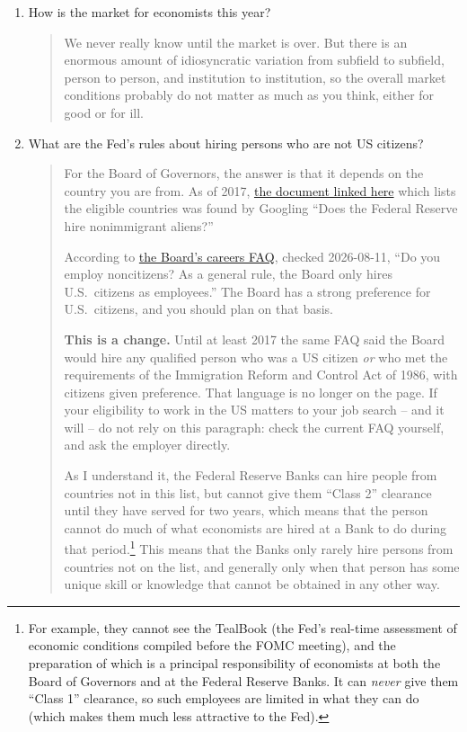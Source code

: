 \documentclass{\classes/econtex}
\begin{document}
\begin{enumerate}
\item  How is the market for economists this year?

  \begin{quote}
    We never really know until the market is over.  But there is an enormous amount of idiosyncratic
    variation from subfield to subfield, person to person, and institution to
    institution, so the overall market conditions probably do not matter as much
    as you think, either for good or for ill.

  \end{quote}
\item  {}  What are the Fed's rules about hiring persons who are not US citizens? 

  \begin{quote}
    For the Board of Governors, the answer is that it depends on the country you are from.  As of 2017, \href{https://www.federalreserve.gov/boarddocs/srletters/2006/SR0614a3.pdf}{the document linked here} which lists the eligible countries was found by Googling ``Does the Federal Reserve hire nonimmigrant aliens?'' 

    According to \href{https://www.federalreserve.gov/careers-faqs.htm}{the Board's careers FAQ}, checked 2026-08-11, ``Do you employ noncitizens?  As a general rule, the Board only hires U.S.\ citizens as employees.''  The Board has a strong preference for U.S.\ citizens, and you should plan on that basis.

      \textbf{This is a change.}  Until at least 2017 the same FAQ said the Board would hire any qualified person who was a US citizen \textit{or} who met the requirements of the Immigration Reform and Control Act of 1986, with citizens given preference.  That language is no longer on the page.  If your eligibility to work in the US matters to your job search -- and it will -- do not rely on this paragraph: check the current FAQ yourself, and ask the employer directly.

      As I understand it, the Federal Reserve Banks can hire people from countries not in this list, but cannot give them ``Class 2'' clearance until they have served for two years, which means that the person cannot do much of what economists are hired at a Bank to do during that period.\footnote{For example, they cannot see the TealBook (the Fed's real-time assessment of economic conditions compiled before the FOMC meeting), and the preparation of which is a principal responsibility of economists at both the Board of Governors and at the Federal Reserve Banks.  It can \textit{never} give them ``Class 1'' clearance, so such employees are limited in what they can do (which makes them much less attractive to the Fed).}  This means that the Banks only rarely hire persons from countries not on the list, and generally only when that person has some unique skill or knowledge that cannot be obtained in any other way.


\end{quote}
\end{enumerate}
\end{document}
